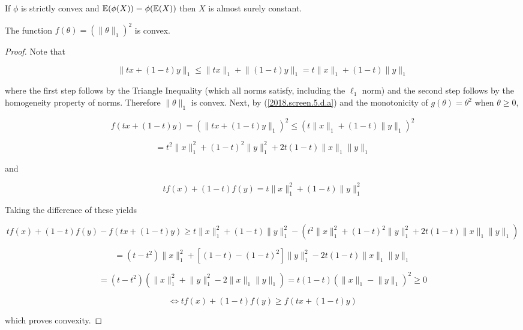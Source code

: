 \begin{proposition}If \(\phi\) is strictly convex and \(\mathbb{E}(\phi(X)) = \phi(\mathbb{E}(X))\) then \(X\) is almost surely constant.

\end{proposition}

\begin{proposition} The function \(f(\theta) = ( \lVert \theta \rVert_1)^2\) is convex.

\end{proposition}

\begin{proof}


Note that

\begin{equation}\label{2018.screen.5.d.a}
\lVert tx+(1-t)y \rVert_1 \leq \lVert tx \rVert_1  + \lVert (1-t)y \rVert_1 = t \lVert x \rVert_1  + (1-t) \lVert y \rVert_1 
\end{equation}

where the first step follows by the Triangle Inequality (which all norms satisfy, including the \(\ell_1\) norm) and the second step follows by the homogeneity property of norms. Therefore \(\lVert \theta \rVert_1\) is convex. Next, by (\ref{2018.screen.5.d.a}) and the monotonicity of \(g(\theta) = \theta^2\) when \(\theta \geq 0\),


\[
f(tx+(1-t)y) = \left( \lVert tx+(1-t)y \rVert_1 \right)^2 \leq \left(  t \lVert x \rVert_1  + (1-t) \lVert y \rVert_1  \right)^2 
\]

\[
= t^2 \lVert x \rVert_1^2 + (1-t)^2 \lVert y \rVert_1^2 +2t(1-t) \lVert x \rVert_1 \lVert y \rVert_1 
\]

and

\[
tf(x) + (1-t)f(y) = t \lVert x \rVert_1^2 + (1-t) \lVert y \rVert_1^2
\]

Taking the difference of these yields

\[
tf(x) + (1-t)f(y)  - f(tx+(1-t)y)  \geq t \lVert x \rVert_1^2 + (1-t) \lVert y \rVert_1^2 - \left(  t^2 \lVert x \rVert_1^2 + (1-t)^2 \lVert y \rVert_1^2 +2t(1-t) \lVert x \rVert_1 \lVert y \rVert_1  \right)
\]

\[
=( t - t^2) \lVert x \rVert_1^2 + [(1-t) - (1-t)^2] \lVert y \rVert_1^2 - 2t(1-t)\lVert x \rVert_1 \lVert y \rVert_1 
\]

\[
=(t - t^2)\left( \lVert x \rVert_1^2 + \lVert y \rVert_1^2 - 2\lVert x \rVert_1 \lVert y \rVert_1 \right) = t(1-t)(\lVert x \rVert_1 - \lVert y \rVert_1)^2 \geq 0
\]

\[
\iff  tf(x) + (1-t)f(y)  \geq f(tx+(1-t)y)  
\]

which proves convexity.

\end{proof}



